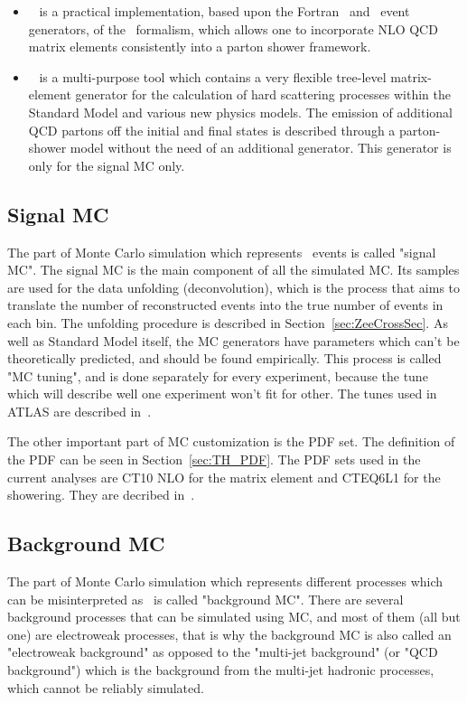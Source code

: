 \begin{itemize}
\item \Mcatnlo~\cite{lib:MC_mcatnlo} is a practical implementation, based upon the Fortran \Herwig\ and \Herwigpp\ event generators, of the \Mcatnlo\ formalism, which allows one to incorporate NLO QCD matrix elements consistently into a parton shower framework.

\item \Sherpa~\cite{lib:MC_sherpa1, lib:MC_sherpa2} is a multi-purpose tool which contains a very flexible tree-level matrix-element generator for the calculation of hard scattering processes within the Standard Model and various new physics models.  The emission of additional QCD partons off  the  initial  and  final  states  is  described through a parton-shower model without the need of an additional generator. This generator is only for the signal MC only.
\end{itemize}

\subsection{Signal MC}

The part of Monte Carlo simulation which represents \Zee\ events is called "signal MC". The signal MC is the main component of all the simulated MC. Its samples are used for the data unfolding (deconvolution), which is the process that aims to translate the number of reconstructed events into the true number of events in each bin. The unfolding procedure is described in Section~\ref{sec:ZeeCrossSec}. As well as Standard Model itself, the MC generators have parameters which can't be theoretically predicted, and should be found empirically. This process is called "MC tuning", and is done separately for every experiment, because the tune which will describe well one experiment won't fit for other. The tunes used in ATLAS are described in~\cite{lib:MC_tune1, lib:MC_tune2}.

The other important part of MC customization is the PDF set. The definition of the PDF can be seen in Section~\ref{sec:TH_PDF}. The PDF sets used in the current analyses are CT10 NLO for the matrix element and CTEQ6L1 for the showering. They are decribed in~\cite{lib:MC_pdfct10, lib:MC_pdfcteq6l1}.

\subsection{Background MC}

The part of Monte Carlo simulation which represents different processes which can be misinterpreted as \Zee\ is called "background MC". There are several background processes that can be simulated using MC, and most of them (all but one) are electroweak processes, that is why the background MC is also called an "electroweak background" as opposed to the "multi-jet background" (or "QCD background") which is the background from the multi-jet hadronic processes, which cannot be reliably simulated.

